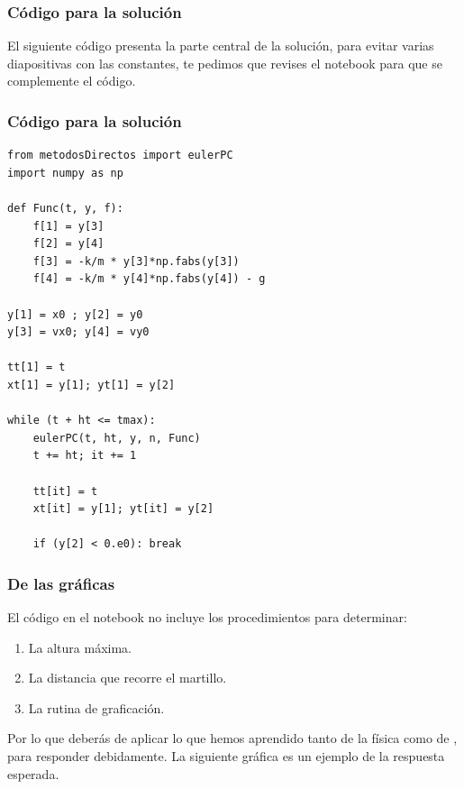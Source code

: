 \documentclass[12pt]{beamer}
\begin{document}
\begin{frame}
\frametitle{Código para la solución}
El siguiente código presenta la parte central de la solución, para evitar varias diapositivas con las constantes, te pedimos que revises el notebook para que se complemente el código.
\end{frame}
\begin{frame}
\frametitle{Código para la solución}
\begin{lstlisting}[caption=Código con el método Corrector-Predictor de Euler]
from metodosDirectos import eulerPC
import numpy as np

def Func(t, y, f):
    f[1] = y[3]
    f[2] = y[4]
    f[3] = -k/m * y[3]*np.fabs(y[3])
    f[4] = -k/m * y[4]*np.fabs(y[4]) - g

y[1] = x0 ; y[2] = y0
y[3] = vx0; y[4] = vy0

tt[1] = t
xt[1] = y[1]; yt[1] = y[2]

while (t + ht <= tmax):
    eulerPC(t, ht, y, n, Func)
    t += ht; it += 1
   
    tt[it] = t
    xt[it] = y[1]; yt[it] = y[2]
   
    if (y[2] < 0.e0): break
\end{lstlisting}
\end{frame}
\begin{frame}
\frametitle{De las gráficas}
El código en el notebook no incluye los procedimientos para determinar:
\begin{enumerate}[<+->]
\item La altura máxima.
\item La distancia que recorre el martillo.
\item La rutina de graficación.
\end{enumerate}
\pause
Por lo que deberás de aplicar lo que hemos aprendido tanto de la física como de \python, para responder debidamente. La siguiente gráfica es un ejemplo de la respuesta esperada.
\end{frame}
\end{document}

